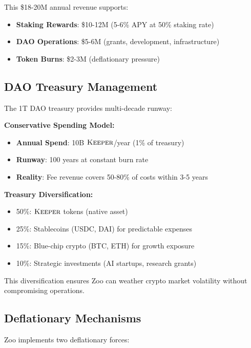 This \$18-20M annual revenue supports:
\begin{itemize}
\item \textbf{Staking Rewards}: \$10-12M (5-6\% APY at 50\% staking rate)
\item \textbf{DAO Operations}: \$5-6M (grants, development, infrastructure)
\item \textbf{Token Burns}: \$2-3M (deflationary pressure)
\end{itemize}

\subsection{DAO Treasury Management}

The 1T DAO treasury provides multi-decade runway:

\textbf{Conservative Spending Model:}
\begin{itemize}
\item \textbf{Annual Spend}: 10B $\textsc{Keeper}$/year (1\% of treasury)
\item \textbf{Runway}: 100 years at constant burn rate
\item \textbf{Reality}: Fee revenue covers 50-80\% of costs within 3-5 years
\end{itemize}

\textbf{Treasury Diversification:}
\begin{itemize}
\item 50\%: $\textsc{Keeper}$ tokens (native asset)
\item 25\%: Stablecoins (USDC, DAI) for predictable expenses
\item 15\%: Blue-chip crypto (BTC, ETH) for growth exposure
\item 10\%: Strategic investments (AI startups, research grants)
\end{itemize}

This diversification ensures Zoo can weather crypto market volatility without compromising operations.

\subsection{Deflationary Mechanisms}

Zoo implements two deflationary forces:

